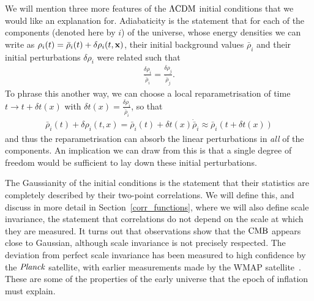 

    We will mention three more features of the $\Lambda\text{CDM}$ initial conditions that we would
    like an explanation for.
    Adiabaticity is the statement that for each of the components (denoted here by $i$) of the universe,
    whose energy densities we can write as
    $\rho_i(t) = \bar{\rho}_i(t)+\delta\rho_i(t,\mathbf{x})$, their
    initial background values $\bar{\rho}_i$ and their
    initial perturbations $\delta\rho_i$ were related such that
    \begin{align}
        \frac{\delta\rho_i}{\dot{\bar{\rho}}_i} = \frac{\delta\rho_j}{\dot{\bar{\rho}}_j}.
    \end{align}
    To phrase this another way, we can choose a local reparametrisation of time $t\rightarrow t+\delta t(x)$
    with $\delta t(x)=\frac{\delta\rho_i}{\dot{\bar{\rho}}_i}$, so that
    \begin{align}
        \bar{\rho}_i(t)+\delta \rho_i(t,x) = \bar{\rho}_i(t)+\delta t(x)\dot{\bar{\rho}}_i
        \approx \bar{\rho}_i(t+\delta t(x))
    \end{align}
    and thus the reparametrisation can absorb the linear perturbations in
    \textit{all} of the components.
    An implication we can draw from this is that a single degree of freedom
    would be sufficient to lay down these initial perturbations.


    The Gaussianity of the initial conditions is the statement that their statistics are completely described by
    their two-point correlations. We will define this, and discuss in more detail
    in Section~\ref{corr_functions}, where we will also define scale invariance,
    the statement that correlations do not depend on the scale at which they are measured.
    It turns out that observations show that the $\text{CMB}$ appears close to Gaussian, although
    scale invariance is not precisely respected.
    The deviation from perfect scale invariance has been measured to high confidence by the $\textit{Planck}$
    satellite, with
    earlier measurements made by the WMAP satellite~\cite{Senatore_wmap_2009}.
    These are some of the properties of the early universe that the epoch of inflation
    must explain.


